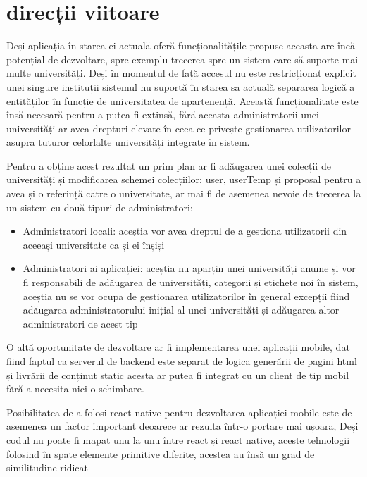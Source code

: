 \documentclass[12pt,a4paper,hidelinks]{report}
\theoremstyle{definition}
\theoremstyle{remark}
\begin{document}
\section{direcții viitoare}
Deși aplicația în starea ei actuală oferă funcționalitățile propuse aceasta are încă 
potențial de dezvoltare, spre exemplu trecerea spre un sistem care să suporte mai multe universități. 
Deși în momentul de față accesul nu este restricționat explicit unei singure instituții
sistemul nu suportă în starea sa actuală separarea logică a entităților în funcție de universitatea de apartenență.
Această funcționalitate este însă necesară pentru a putea fi extinsă, fără aceasta administratorii unei universități ar avea drepturi elevate
în ceea ce privește gestionarea utilizatorilor asupra tuturor celorlalte universități integrate în sistem.

Pentru a obține acest rezultat un prim plan ar fi adăugarea unei colecții de universități și modificarea schemei colecțiilor: 
user, userTemp și proposal pentru a avea și o referință către o universitate, ar mai fi de asemenea nevoie de trecerea la un sistem
cu două tipuri de administratori:
\begin{itemize}
    \item Administratori locali: aceștia vor avea dreptul de a gestiona utilizatorii din aceeași universitate ca și ei înșiși
    \item Administratori ai aplicației: aceștia nu aparțin unei universități anume și vor fi responsabili de adăugarea de 
    universități, categorii și etichete noi în sistem, aceștia nu se vor ocupa de gestionarea utilizatorilor în general excepții fiind 
    adăugarea administratorului inițial al unei universități și adăugarea altor administratori de acest tip
\end{itemize}

O altă oportunitate de dezvoltare ar fi implementarea unei aplicații mobile, dat fiind faptul ca serverul de backend 
este separat de logica generării de pagini html și livrării de conținut static acesta ar putea fi integrat cu un client
de tip mobil fără a necesita nici o schimbare.

Posibilitatea de a folosi react native pentru dezvoltarea aplicației mobile este de asemenea un factor important deoarece
ar rezulta într-o portare mai ușoara, Deși codul nu poate fi mapat unu la unu între react și react native, aceste tehnologii folosind 
în spate elemente primitive diferite, acestea au însă un grad de similitudine ridicat
\end{document}
